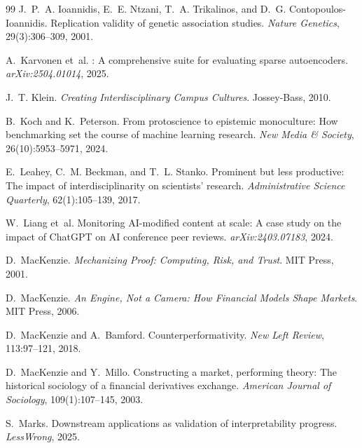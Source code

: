 \documentclass{article}
\begin{document}
\begin{thebibliography}{99}
J.~P.~A. Ioannidis, E.~E. Ntzani, T.~A. Trikalinos, and D.~G. Contopoulos-Ioannidis.
\newblock Replication validity of genetic association studies.
\newblock \emph{Nature Genetics}, 29(3):306--309, 2001.

A.~Karvonen et~al.
: A comprehensive suite for evaluating sparse autoencoders.
\newblock \emph{arXiv:2504.01014}, 2025.

J.~T. Klein.
\newblock \emph{Creating Interdisciplinary Campus Cultures}.
\newblock Jossey-Bass, 2010.

B.~Koch and K.~Peterson.
\newblock From protoscience to epistemic monoculture: How benchmarking set the course of machine learning research.
\newblock \emph{New Media \& Society}, 26(10):5953--5971, 2024.

E.~Leahey, C.~M. Beckman, and T.~L. Stanko.
\newblock Prominent but less productive: The impact of interdisciplinarity on scientists' research.
\newblock \emph{Administrative Science Quarterly}, 62(1):105--139, 2017.

W.~Liang et~al.
\newblock Monitoring {AI}-modified content at scale: A case study on the impact of {ChatGPT} on {AI} conference peer reviews.
\newblock \emph{arXiv:2403.07183}, 2024.

D.~MacKenzie.
\newblock \emph{Mechanizing Proof: Computing, Risk, and Trust}.
\newblock MIT Press, 2001.

D.~MacKenzie.
\newblock \emph{An Engine, Not a Camera: How Financial Models Shape Markets}.
\newblock MIT Press, 2006.

D.~MacKenzie and A.~Bamford.
\newblock Counterperformativity.
\newblock \emph{New Left Review}, 113:97--121, 2018.

D.~MacKenzie and Y.~Millo.
\newblock Constructing a market, performing theory: The historical sociology of a financial derivatives exchange.
\newblock \emph{American Journal of Sociology}, 109(1):107--145, 2003.

S.~Marks.
\newblock Downstream applications as validation of interpretability progress.
\newblock \emph{LessWrong}, 2025.


\end{thebibliography}
\end{document}
